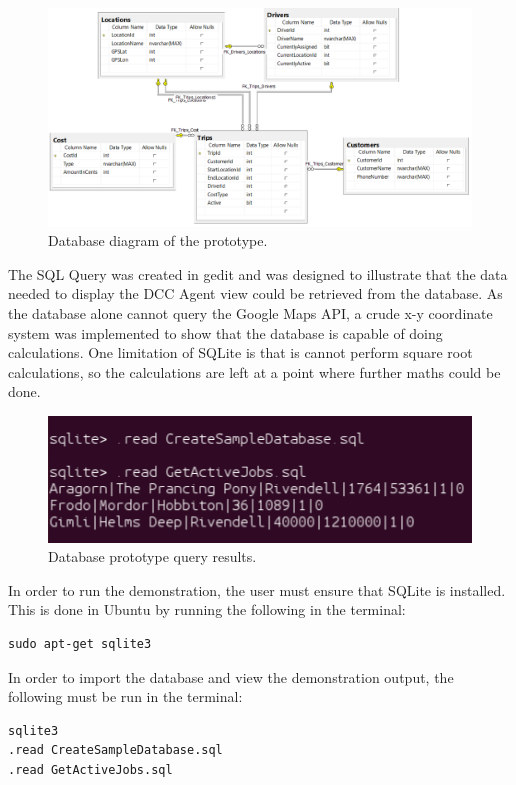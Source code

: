 \documentclass[12pt]{article}
\begin{document}
\begin{figure}[ht]
\centering
\includegraphics[width=1\textwidth]{Database_Diagram.png}
\caption{Database diagram of the prototype.}
\end{figure}

The SQL Query was created in gedit and was designed to illustrate that the data needed to display the DCC Agent view could be retrieved from the database. As the database alone cannot query the Google Maps API, a crude x-y coordinate system was implemented to show that the database is capable of doing calculations. One limitation of SQLite is that is cannot perform square root calculations, so the calculations are left at a point where further maths could be done. \\

\begin{figure}[ht]
\centering
\includegraphics[width=1\textwidth]{Query_Results.png}
\caption{Database prototype query results.}
\end{figure}

In order to run the demonstration, the user must ensure that SQLite is installed. This is done in Ubuntu by running the following in the terminal:
\begin{verbatim}
sudo apt-get sqlite3
\end{verbatim}
In order to import the database and view the demonstration output, the following must be run in the terminal:
\begin{verbatim}
sqlite3
.read CreateSampleDatabase.sql
.read GetActiveJobs.sql
\end{verbatim}
\end{document}
